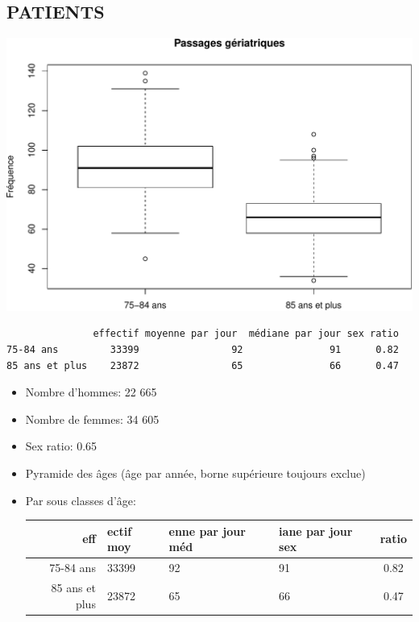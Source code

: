 \documentclass[]{article}
\begin{document}
\subsection{PATIENTS}\label{patients-2}

\includegraphics{rapport2014_V4_files/figure-latex/sexe75-1.pdf}

\begin{verbatim}
               effectif moyenne par jour  médiane par jour sex ratio
75-84 ans         33399                92               91      0.82
85 ans et plus    23872                65               66      0.47
\end{verbatim}

\begin{itemize}
\item
  Nombre d'hommes: 22 665
\item
  Nombre de femmes: 34 605
\item
  Sex ratio: 0.65
\item
  Pyramide des âges (âge par année, borne supérieure toujours exclue)
\item
  Par sous classes d'âge:

  \begin{longtable}[c]{@{}rlllc@{}}
  \toprule
  eff & ectif moy & enne par jour méd & iane par jour sex &
  ratio\tabularnewline
  \midrule
  \endhead
  75-84 ans & 33399 & 92 & 91 & 0.82\tabularnewline
  85 ans et plus & 23872 & 65 & 66 & 0.47\tabularnewline
  \bottomrule
  \end{longtable}
\end{itemize}
\end{document}
